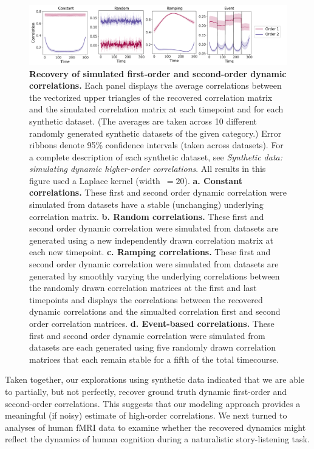\documentclass[english]{article}
\begin{document}
\begin{figure}[tp]
  \centering
  \includegraphics[width=\textwidth]{figs/higher_order_sims}
  \caption{\textbf{Recovery of simulated first-order and second-order dynamic correlations.}  Each panel displays the average correlations
    between the vectorized upper triangles of the recovered
    correlation matrix and the simulated correlation matrix at each
    timepoint and for each synthetic dataset.  (The averages are taken across 10 different
    randomly generated synthetic datasets of the given category.)
    Error ribbons denote 95\% confidence intervals (taken across
    datasets).  For a complete description of each synthetic dataset,
    see \textit{Synthetic data: simulating dynamic higher-order
      correlations}.  All results in this figure used a Laplace kernel
    (width~$=20$).  \textbf{a. Constant correlations.}
    These first and second order dynamic correlation were
    simulated from datasets have a stable (unchanging) underlying correlation
    matrix.  \textbf{b. Random correlations.}  These first and second order dynamic correlation were
    simulated from datasets are
    generated using a new independently drawn correlation matrix at
    each new timepoint.  \textbf{c. Ramping correlations.}  These first and second order dynamic correlation were
    simulated from
    datasets are generated by smoothly varying the underlying
    correlations between the randomly drawn correlation matrices at
    the first and last timepoints and displays the
    correlations between the recovered dynamic correlations and the
  simualted correlation first and second order correlation matrices.   \textbf{d. Event-based correlations.}  These first and second order dynamic correlation were
    simulated from datasets are
    each generated using five randomly drawn correlation matrices that
    each remain stable for a fifth of the total timecourse.  }
  \label{fig:higher_order_sims}
\end{figure}

Taken together, our explorations using synthetic data indicated that
we are able to partially, but not perfectly, recover ground truth
dynamic first-order and second-order correlations.  This suggests that
our modeling approach provides a meaningful (if noisy) estimate of
high-order correlations.  We next turned to analyses of human fMRI data
to examine whether the recovered dynamics might reflect the dynamics
of human cognition during a naturalistic story-listening task.
\end{document}
